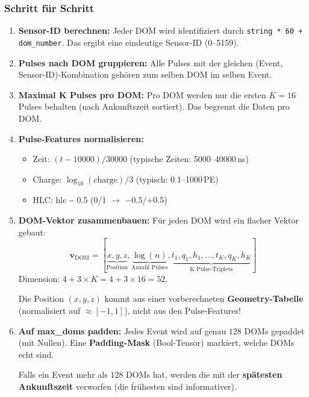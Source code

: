 \documentclass[12pt, a4paper]{article}
\begin{document}
\subsubsection{Schritt f\"ur Schritt}

\begin{enumerate}[label=\textbf{Schritt \arabic*:}]

\item \textbf{Sensor-ID berechnen:}
Jeder DOM wird identifiziert durch \texttt{string * 60 + dom\_number}.
Das ergibt eine eindeutige Sensor-ID (0--5159).

\item \textbf{Pulses nach DOM gruppieren:}
Alle Pulses mit der gleichen (Event, Sensor-ID)-Kombination geh\"oren
zum selben DOM im selben Event.

\item \textbf{Maximal K Pulses pro DOM:}
Pro DOM werden nur die ersten $K = 16$ Pulses behalten (nach Ankunftszeit
sortiert). Das begrenzt die Daten pro DOM.

\item \textbf{Pulse-Features normalisieren:}
\begin{itemize}
    \item Zeit: $(t - 10000) / 30000$ \quad (typische Zeiten: 5000--40000\,ns)
    \item Charge: $\log_{10}(\text{charge}) / 3$ \quad (typisch: 0.1--1000\,PE)
    \item HLC: $\text{hlc} - 0.5$ \quad (0/1 $\to$ $-0.5$/$+0.5$)
\end{itemize}

\item \textbf{DOM-Vektor zusammenbauen:}
F\"ur jeden DOM wird ein flacher Vektor gebaut:
\[
    \mathbf{v}_\text{DOM} = [\underbrace{x, y, z}_\text{Position}, \underbrace{\log(n)}_\text{Anzahl Pulses}, \underbrace{t_1, q_1, h_1, \ldots, t_K, q_K, h_K}_\text{K Pulse-Triplets}]
\]
Dimension: $4 + 3 \times K = 4 + 3 \times 16 = 52$.

Die Position $(x, y, z)$ kommt aus einer vorberechneten \textbf{Geometry-Tabelle}
(normalisiert auf $\approx [-1, 1]$), nicht aus den Pulse-Features!

\item \textbf{Auf max\_doms padden:}
Jedes Event wird auf genau $128$ DOMs gepaddet (mit Nullen).
Eine \textbf{Padding-Mask} (Bool-Tensor) markiert, welche DOMs echt sind.

Falls ein Event mehr als 128 DOMs hat, werden die mit der \textbf{sp\"atesten
Ankunftszeit} verworfen (die fr\"uhesten sind informativer).

\end{enumerate}
\end{document}
